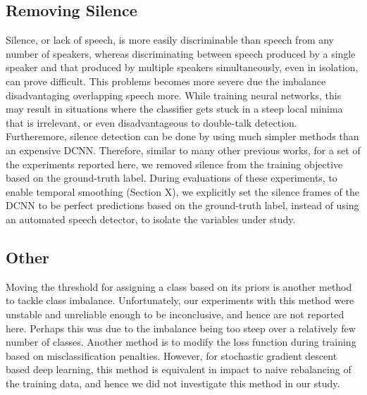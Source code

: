 \documentclass[a4paper]{article}
\begin{document}
\subsection{Removing Silence} \label{sec:rm-silence}
Silence, or lack of speech, is more easily discriminable than speech from any number of speakers,
whereas discriminating between speech produced by a single speaker and that produced by multiple speakers simultaneously, even in isolation, can prove difficult.
This problems becomes more severe due the imbalance disadvantaging overlapping speech more.
While training neural networks, this may result in situations where the classifier gets stuck in a steep local minima that is irrelevant, or even disadvantageous to double-talk detection.
Furtheremore, silence detection can be done by using much simpler methods than an expensive DCNN.  %
Therefore, similar to many other previous works,  %
for a set of the experiments reported here,
we removed silence from the training objective based on the ground-truth label.
During evaluations of these experiments,
to enable temporal smoothing (Section X),  %
we explicitly set the silence frames of the DCNN to be perfect predictions based on the ground-truth label,
instead of using an automated speech detector, to isolate the variables under study.

\subsection{Other}
Moving the threshold for assigning a class based on its priors is another method to tackle class imbalance.
Unfortunately, our experiments with this method were unstable and unreliable enough to be inconclusive, and hence are not reported here.
Perhaps this was due to the imbalance being too steep over a relatively few number of classes.
Another method is to modify the loss function during training based on misclassification penalties.
However, for stochastic gradient descent based deep learning,
this method is equivalent in impact to naive rebalancing of the training data,  %
and hence we did not investigate this method in our study.

\end{document}
